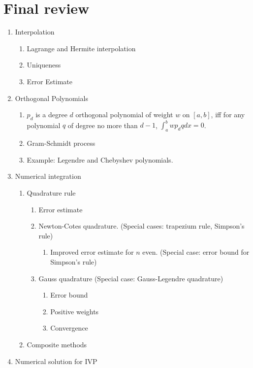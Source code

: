 \documentclass[20pt]{article} %
\theoremstyle{break}
\begin{document}
\section{Final review}
{\footnotesize
\begin{enumerate}
  \item Interpolation
  \begin{enumerate}
   \item Lagrange and Hermite interpolation
   \item Uniqueness
   \item Error Estimate
  \end{enumerate}
\item Orthogonal Polynomials
  \begin{enumerate}
  \item $p_d$ is a degree $d$ orthogonal polynomial of weight $w$ on $[a, b]$, iff for any polynomial $q$ of degree no more than $d-1$, $\int_a^bwp_dqdx=0$. 
    \item Gram-Schmidt process
   \item Example: Legendre and Chebyshev polynomials.
   \end{enumerate}
 \item Numerical integration
   \begin{enumerate}
   \item Quadrature rule
     \begin{enumerate}
     \item Error estimate
     \item Newton-Cotes quadrature. (Special cases: trapezium rule, Simpson's rule)
       \begin{enumerate}
        \item Improved error estimate for $n$ even. (Special case: error bound for Simpson's rule)
        \end{enumerate}
     \item Gauss quadrature (Special case: Gauss-Legendre quadrature)
       \begin{enumerate}
        \item Error bound
        \item Positive weights
        \item Convergence
        \end{enumerate}
     \end{enumerate}
    \item Composite methods
   \end{enumerate}
 \item Numerical solution for IVP

\end{enumerate}}
\end{document}
